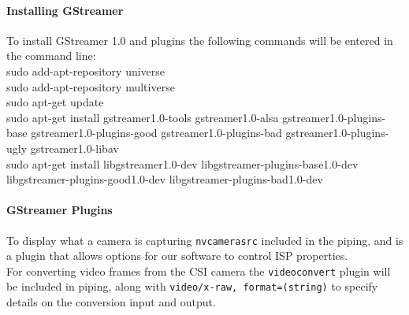 \documentclass[letterpaper,10pt,serif,draftclsnofoot,onecolumn,compsoc,titlepage]{IEEEtran}
\begin{document}
\paragraph{Installing GStreamer}

To install GStreamer 1.0 and plugins the following commands will be entered in the 
command line: \\

sudo add-apt-repository universe \\
sudo add-apt-repository multiverse \\
sudo apt-get update \\
sudo apt-get install gstreamer1.0-tools gstreamer1.0-alsa gstreamer1.0-plugins-base 
gstreamer1.0-plugins-good gstreamer1.0-plugins-bad gstreamer1.0-plugins-ugly 
gstreamer1.0-libav \\
sudo apt-get install libgstreamer1.0-dev libgstreamer-plugins-base1.0-dev 
libgstreamer-plugins-good1.0-dev libgstreamer-plugins-bad1.0-dev \\

\paragraph{GStreamer Plugins}

To display what a camera is capturing \texttt{nvcamerasrc} included in the piping, 
and is a plugin that allows options for our software to control ISP properties. \\

For converting video frames from the CSI camera the \texttt{videoconvert} plugin will 
be included in piping, along with \texttt{video/x-raw, format=(string){}} to specify 
details on the conversion input and output. \\


\nocite{*}
%
%
\end{document}
